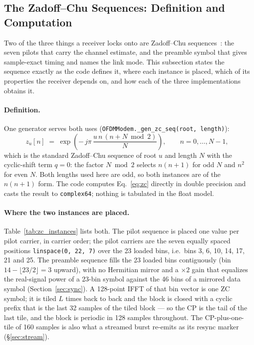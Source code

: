 \subsection{The Zadoff--Chu Sequences: Definition and Computation}
\label{sec:zc}

Two of the three things a receiver locks onto are Zadoff--Chu
sequences~\cite{chu1972}: the seven pilots that carry the channel
estimate, and the preamble symbol that gives sample-exact timing and
names the link mode.  This subsection states the sequence exactly as
the code defines it, where each instance is placed, which of its
properties the receiver depends on, and how each of the three
implementations obtains it.

\paragraph{Definition.}  One generator serves both uses
(\texttt{OFDMModem.\_gen\_zc\_seq(root, length)}):
\begin{equation}
    z_u[n] \;=\; \exp\!\left(-\,j\pi\,\frac{u\,n\,(n + N \bmod 2)}{N}\right),
    \qquad n = 0, \ldots, N-1,
    \label{eq:zc}
\end{equation}
which is the standard Zadoff--Chu sequence of root $u$ and length $N$
with the cyclic-shift term $q = 0$: the factor $N \bmod 2$ selects
$n(n+1)$ for odd $N$ and $n^2$ for even $N$.  Both lengths used here
are odd, so both instances are of the $n(n+1)$ form.  The code computes
Eq.~\eqref{eq:zc} directly in double precision and casts the result to
\texttt{complex64}; nothing is tabulated in the float model.

\paragraph{Where the two instances are placed.}
Table~\ref{tab:zc_instances} lists both.  The pilot sequence is placed
one value per pilot carrier, in carrier order; the pilot carriers are
the seven equally spaced positions \texttt{linspace(0, 22, 7)} over
the 23 loaded bins, i.e.\ bins 3, 6, 10, 14, 17, 21 and 25.  The
preamble sequence fills the 23 loaded bins contiguously (bin
$14 - \lfloor 23/2 \rfloor = 3$ upward), with no Hermitian mirror and
a $\times 2$ gain that equalizes the real-signal power of a 23-bin
symbol against the 46 bins of a mirrored data symbol
(Section~\ref{sec:sync}).  A 128-point IFFT of that bin vector is one
ZC symbol; it is tiled $L$ times back to back and the block is closed
with a cyclic prefix that is the last 32 samples of the tiled block ---
so the CP is the tail of the last tile, and the block is periodic in
128 samples throughout.  The CP-plus-one-tile of 160 samples is also
what a streamed burst re-emits as its resync marker
(\S\ref{sec:stream}).

